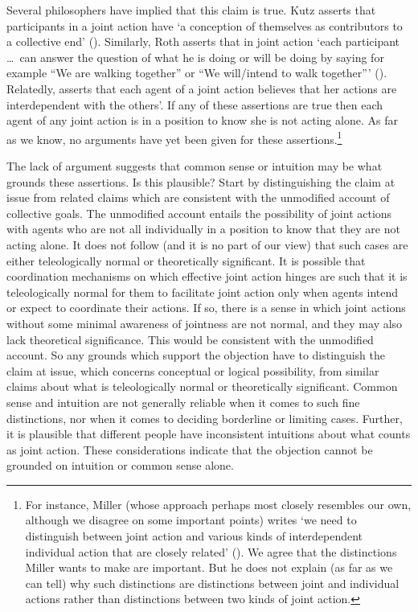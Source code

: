 \documentclass[12pt,a4paper]{extarticle}
\begin{document}
Several philosophers have  implied that this claim is true.  
Kutz asserts that participants in a joint action have 
`a conception of themselves as contributors to a collective end' (\citeyear[p.\ 10]{Kutz:2000si}).
Similarly, Roth asserts that in joint action `each participant \ldots \ can answer the question of what he is doing or will be doing by saying for example ``We are walking together'' or ``We will/intend to walk together''' 
(\citeyear[p.\ 361]{Roth:2004ki}).
Relatedly, \citet[p. 56]{miller_social_2001} asserts that each agent of a joint action believes that her actions are interdependent with the others'.
If any of these assertions are true then each agent of any joint action is in a position to know she is not acting alone.
As far as we know, no arguments have yet been given for these assertions.\footnote{
For instance, Miller (whose approach perhaps most closely resembles our own, although we disagree on some important points) writes `we need to distinguish between joint action and various kinds of interdependent individual action that are closely related' (\citeyear[p. 56]{miller_social_2001}).
We agree that the distinctions Miller wants to make are important.
But he does not explain (as far as we can tell) why such distinctions are distinctions between joint and individual actions rather than distinctions between two kinds of joint action.
}

The lack of argument suggests that common sense or intuition may be what grounds these assertions.
Is this plausible?
Start by distinguishing the claim at issue from related claims which are consistent with the unmodified account of collective goals.
The unmodified account entails the possibility of joint actions with agents who are not all individually in a position to know that they are not acting alone.
It does not follow (and it is no part of our view) that such cases are either teleologically normal or theoretically significant.
It is possible that coordination mechanisms on which effective joint action hinges are such that it is teleologically normal for them to facilitate joint action only when agents intend or expect to coordinate their actions.
If so, there is a sense in which joint actions without some minimal awareness of jointness are not normal, and they may also lack theoretical significance.
This would be consistent with the unmodified account.
So any grounds which support the objection have to distinguish the claim at issue, which concerns conceptual or logical possibility, from similar claims about what is teleologically normal or theoretically significant.  
Common sense and intuition are not generally reliable when it comes to such fine distinctions, nor when it comes to deciding borderline or limiting cases.
Further, it is plausible that different people have inconsistent intuitions about what counts as joint action.
These considerations indicate that the objection cannot be grounded on intuition or common sense alone.
\end{document}
